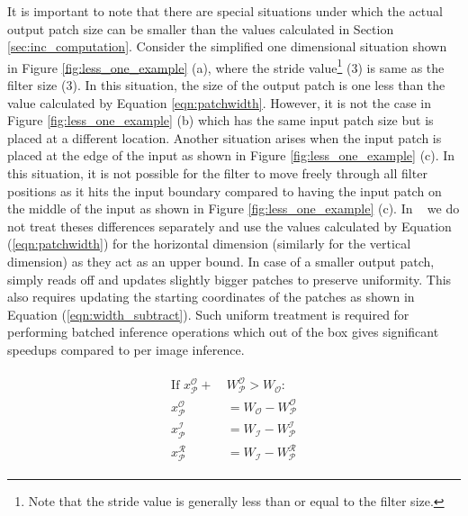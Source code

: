 It is important to note that there are special situations under which the actual output patch size can be smaller than the values calculated in Section \ref{sec:inc_computation}. Consider the simplified one dimensional situation shown in Figure \ref{fig:less_one_example} (a), where the stride value\footnote{Note that the stride value is generally less than or equal to the filter size.} (3) is same as the filter size (3). In this situation, the size of the output patch is one less than the value calculated by Equation \ref{eqn:patchwidth}. However, it is not the case in Figure \ref{fig:less_one_example} (b) which has the same input patch size but is placed at a different location.
Another situation arises when the input patch is placed at the edge of the input as shown in Figure \ref{fig:less_one_example} (c). In this situation, it is not possible for the filter to move freely through all filter positions as it hits the input boundary compared to having the input patch on the middle of the input as shown in Figure \ref{fig:less_one_example} (c).
In \system~ we do not treat theses differences separately and use the values calculated by Equation (\ref{eqn:patchwidth}) for the horizontal dimension (similarly for the vertical dimension) as they act as an upper bound. In case of a smaller output patch, \system~ simply reads off and updates slightly bigger patches to preserve uniformity.
This also requires updating the starting coordinates of the patches as shown in Equation (\ref{eqn:width_subtract}).
Such uniform treatment is required for performing batched inference operations which out of the box gives significant speedups compared to per image inference.


\begin{align}
\begin{split}
\label{eqn:width_subtract}
\text{If~} x^\mathcal{O}_\mathcal{P} + &~W^\mathcal{O}_\mathcal{P} > W_{\mathcal{O}}:\\
x^\mathcal{O}_\mathcal{P} &~ =  W_{\mathcal{O}} - W^\mathcal{O}_\mathcal{P}\\
x^\mathcal{I}_\mathcal{P} &~ = W_{\mathcal{I}} - W^\mathcal{I}_\mathcal{P}\\
x^\mathcal{R}_\mathcal{P} &~ = W_{\mathcal{I}} - W^\mathcal{R}_\mathcal{P}
\end{split}
\end{align}








